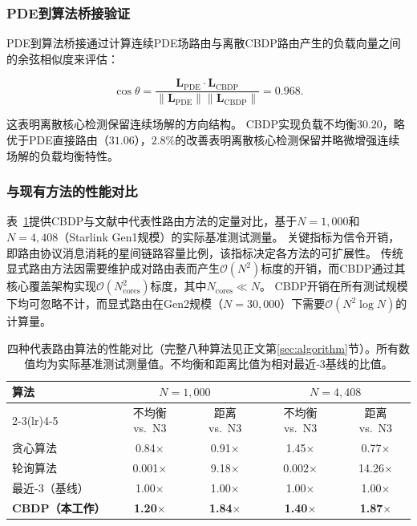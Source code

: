 \documentclass[sn-nature,pdflatex]{sn-jnl}
\begin{document}
\subsubsection{PDE到算法桥接验证}

PDE到算法桥接通过计算连续PDE场路由与离散CBDP路由产生的负载向量之间的余弦相似度来评估：

\begin{equation}
\cos\theta = \frac{\mathbf{L}_{\text{PDE}} \cdot \mathbf{L}_{\text{CBDP}}}{\|\mathbf{L}_{\text{PDE}}\| \|\mathbf{L}_{\text{CBDP}}\|} = 0.968.
\end{equation}

这表明离散核心检测保留连续场解的方向结构。
CBDP实现负载不均衡$30.20$，略优于PDE直接路由（$31.06$），$2.8\%$的改善表明离散核心检测保留并略微增强连续场解的负载均衡特性。

\subsubsection{与现有方法的性能对比}

表~\ref{tab:performance_comparison}提供CBDP与文献中代表性路由方法的定量对比，基于$N=1,000$和$N=4,408$（Starlink Gen1规模）的实际基准测试测量。
关键指标为信令开销，即路由协议消息消耗的星间链路容量比例，该指标决定各方法的可扩展性。
传统显式路由方法因需要维护成对路由表而产生$\mathcal{O}(N^2)$标度的开销，而CBDP通过其核心覆盖架构实现$\mathcal{O}(N_{\text{cores}}^2)$标度，其中$N_{\text{cores}} \ll N$。
CBDP开销在所有测试规模下均可忽略不计，而显式路由在Gen2规模（$N=30,000$）下需要$\mathcal{O}(N^2\log N)$的计算量。

\begin{table}[htbp]
\centering
\caption{四种代表路由算法的性能对比（完整八种算法见正文第\ref{sec:algorithm}节）。所有数值均为实际基准测试测量值。不均衡和距离比值为相对最近-3基线的比值。}
\label{tab:performance_comparison}
\begin{tabular}{lcccc}
\toprule
\multirow{2}{*}{算法} & \multicolumn{2}{c}{$N=1,000$} & \multicolumn{2}{c}{$N=4,408$} \\
\cmidrule(lr){2-3}\cmidrule(lr){4-5}
 & 不均衡 vs.\ N3 & 距离 vs.\ N3 & 不均衡 vs.\ N3 & 距离 vs.\ N3 \\
\midrule
贪心算法 & 0.84$\times$ & 0.91$\times$ & 1.45$\times$ & 0.77$\times$ \\
轮询算法 & 0.001$\times$ & 9.18$\times$ & 0.002$\times$ & 14.26$\times$ \\
最近-3（基线） & 1.00$\times$ & 1.00$\times$ & 1.00$\times$ & 1.00$\times$ \\
\textbf{CBDP（本工作）} & \textbf{1.20$\times$} & \textbf{1.84$\times$} & \textbf{1.40$\times$} & \textbf{1.87$\times$} \\
\bottomrule
\end{tabular}
\end{table}
\end{document}
